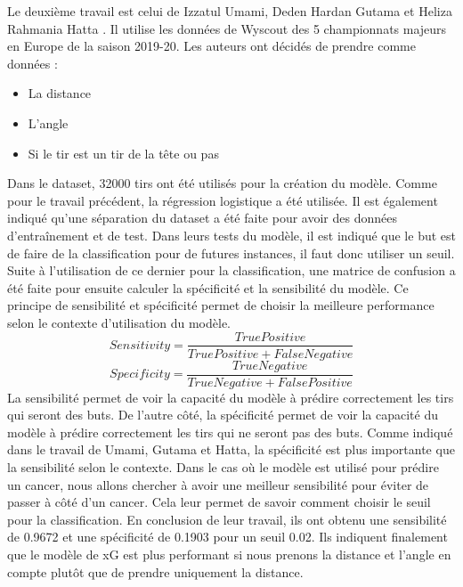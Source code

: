 \documentclass[12pt]{article}
\begin{document}
Le deuxième travail est celui de Izzatul Umami, Deden Hardan Gutama et Heliza Rahmania Hatta \cite{umamiImplementingExpectedGoal2021}. 
Il utilise les données de Wyscout des 5 championnats majeurs en Europe de la saison 2019-20. 
Les auteurs ont décidés de prendre comme données :
\begin{itemize}
    \item La distance
    \item L'angle
    \item Si le tir est un tir de la tête ou pas
\end{itemize}
Dans le dataset, 32000 tirs ont été utilisés pour la création du modèle.
Comme pour le travail précédent, la régression logistique a été utilisée.
Il est également indiqué qu'une séparation du dataset a été faite pour avoir des données d'entraînement et de test.
Dans leurs tests du modèle, il est indiqué que le but est de faire de la classification pour de futures instances, il faut donc utiliser un seuil.
Suite à l'utilisation de ce dernier pour la classification, une matrice de confusion a été faite pour ensuite calculer la spécificité et la sensibilité du modèle.
Ce principe de sensibilité et spécificité permet de choisir la meilleure performance selon le contexte d'utilisation du modèle.
\begin{equation}
    Sensitivity = \frac{True Positive}{True Positive + False Negative}
\end{equation}
\begin{equation}
    Specificity = \frac{True Negative}{True Negative + False Positive}
\end{equation}
La sensibilité permet de voir la capacité du modèle à prédire correctement les tirs qui seront des buts.
De l'autre côté, la spécificité permet de voir la capacité du modèle à prédire correctement les tirs qui ne seront pas des buts.
Comme indiqué dans le travail de Umami, Gutama et Hatta, la spécificité est plus importante que la sensibilité selon le contexte.
Dans le cas où le modèle est utilisé pour prédire un cancer, nous allons chercher à avoir une meilleur sensibilité pour éviter de passer à côté d'un cancer. \cite{umamiImplementingExpectedGoal2021}
Cela leur permet de savoir comment choisir le seuil pour la classification.
En conclusion de leur travail, ils ont obtenu une sensibilité de 0.9672 et une spécificité de 0.1903 pour un seuil 0.02.
Ils indiquent finalement que le modèle de xG est plus performant si nous prenons la distance et l'angle en compte plutôt que de prendre uniquement la distance.
\newline\newline
\end{document}
